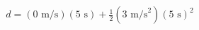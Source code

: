 \documentclass[preview]{standalone}
\begin{document}
\begin{align*}
d = (0 \text{ m/s})(5 \text{ s}) + \frac{1}{2} (3 \text{ m/s}^2)(5 \text{ s})^2
\end{align*}
\end{document}
